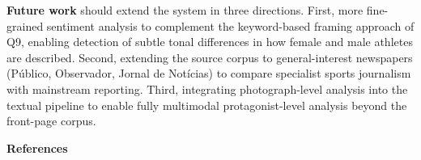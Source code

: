 \documentclass[11pt,a4paper]{article}
\begin{document}
\textbf{Future work} should extend the system in three directions. First, more fine-grained sentiment analysis to complement the keyword-based framing approach of Q9, enabling detection of subtle tonal differences in how female and male athletes are described. Second, extending the source corpus to general-interest newspapers (Público, Observador, Jornal de Notícias) to compare specialist sports journalism with mainstream reporting. Third, integrating photograph-level analysis into the textual pipeline to enable fully multimodal protagonist-level analysis beyond the front-page corpus.

\clearpage
\onecolumn
{}
{}
{\centering\large\bfseries References\par}
\vspace{0.8em}
\renewcommand{\refname}{}
\end{document}
